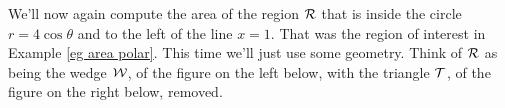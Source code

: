 \begin{eg}\label{eg area polar HS}
We'll now again compute the area of the region $\mathcal{R}$ that is 
inside the circle $r=4\cos\theta$ and to the left of the line $x=1$.
That was the region of interest in Example \ref{eg area polar}.
This time we'll just use some geometry. Think of $\mathcal{R}$ as being
the wedge $\mathcal{W}$, of the figure on the left below, with the triangle
$\mathcal{T}$, of the figure on the right below, removed.


\end{eg}
